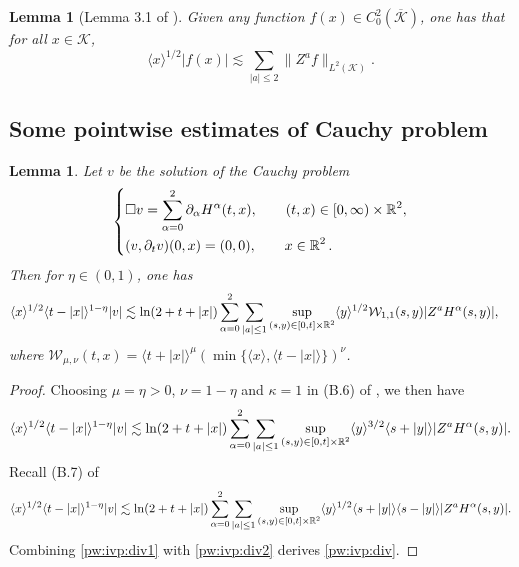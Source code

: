 \documentclass[11pt,twoside]{article}
\def\cK{\mathcal K}
\def\cW{\mathcal W}
\def\R{\mathop{\mathbb R\kern 0pt}\nolimits}
\def\ds{\displaystyle}
\def\p{\partial}
\def\ls{\lesssim}
\newcommand{\w}[1]{\langle {#1} \rangle}
\theoremstyle{plain}
\newtheorem{lemma}[theorem]{Lemma}
\theoremstyle{definition}
\numberwithin{equation}{section}
\begin{document}
\begin{lemma}[Lemma 3.1 of \cite{Kubo13}]
Given any function $f(x)\in C_0^2(\overline{\cK})$, one has that for all $x\in\cK$,
\begin{equation}\label{Sobo:ineq}
\w{x}^{1/2}|f(x)|\ls\sum_{|a|\le2}\|Z^af\|_{L^2(\cK)}.
\end{equation}
\end{lemma}


\subsection{Some pointwise estimates of Cauchy problem}


\begin{lemma}
Let $v$ be the solution of the Cauchy problem
\begin{equation*}
\left\{
\begin{aligned}
&\Box v=\sum_{\alpha=0}^2\p_\alpha H^\alpha(t,x),\qquad(t,x)\in[0,\infty)\times\R^2,\\
&(v,\p_tv)(0,x)=(0,0),\qquad x\in\R^2.
\end{aligned}
\right.
\end{equation*}
Then for $\eta\in(0,1)$, one has
\begin{align}\label{pw:ivp:div}
&\w{x}^{1/2}\w{t-|x|}^{1-\eta}|v|\ls\ln(2+t+|x|)\sum_{\alpha=0}^2\sum_{|a|\le1}\sup_{(s,y)\in[0,t]\times\R^2}\w{y}^{1/2}
\cW_{1,1}(s,y)|Z^aH^\alpha(s,y)|,
\end{align}
where $\ds\cW_{\mu,\nu}(t,x)=\w{t+|x|}^\mu(\min\{\w{x},\w{t-|x|}\})^\nu$.
\end{lemma}
\begin{proof}
Choosing $\mu=\eta>0$, $\nu=1-\eta$ and $\kappa=1$ in (B.6) of \cite{Kubo14}, we then have
\begin{equation}\label{pw:ivp:div1}
\w{x}^{1/2}\w{t-|x|}^{1-\eta}|v|\ls\ln(2+t+|x|)\sum_{\alpha=0}^2
\sum_{|a|\le1}\sup_{(s,y)\in[0,t]\times\R^2}\w{y}^{3/2}\w{s+|y|}|Z^aH^\alpha(s,y)|.
\end{equation}
Recall (B.7) of \cite{Kubo14}
\begin{equation}\label{pw:ivp:div2}
\w{x}^{1/2}\w{t-|x|}^{1-\eta}|v|\ls\ln(2+t+|x|)\sum_{\alpha=0}^2
\sum_{|a|\le1}\sup_{(s,y)\in[0,t]\times\R^2}\w{y}^{1/2}\w{s+|y|}\w{s-|y|}|Z^aH^\alpha(s,y)|.
\end{equation}
Combining \eqref{pw:ivp:div1} with \eqref{pw:ivp:div2} derives \eqref{pw:ivp:div}.
\end{proof}
\end{document}
